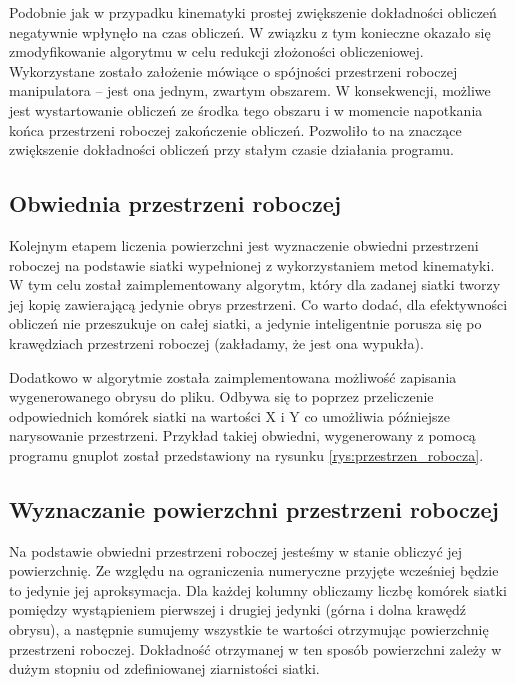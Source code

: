 \documentclass[printmode]{mgr}
\begin{document}
Podobnie jak w przypadku kinematyki prostej zwiększenie dokładności obliczeń negatywnie wpłynęło na czas obliczeń. W związku z tym konieczne okazało się
zmodyfikowanie algorytmu w celu redukcji złożoności obliczeniowej. Wykorzystane zostało założenie mówiące
o spójności przestrzeni roboczej manipulatora -- jest ona jednym, zwartym obszarem. W konsekwencji, możliwe jest
wystartowanie obliczeń ze środka tego obszaru i w momencie napotkania końca przestrzeni roboczej zakończenie obliczeń.
Pozwoliło to na znaczące zwiększenie dokładności obliczeń przy stałym czasie działania programu.

\subsection{Obwiednia przestrzeni roboczej}
Kolejnym etapem liczenia powierzchni jest wyznaczenie obwiedni przestrzeni roboczej na podstawie
siatki wypełnionej z wykorzystaniem metod kinematyki. W tym celu został zaimplementowany algorytm, 
który dla zadanej siatki tworzy jej kopię zawierającą jedynie obrys przestrzeni. Co warto dodać,
dla efektywności obliczeń nie przeszukuje on całej siatki, a jedynie inteligentnie porusza się
po krawędziach przestrzeni roboczej (zakładamy, że jest ona wypukła). 

Dodatkowo w algorytmie została zaimplementowana możliwość zapisania wygenerowanego obrysu do pliku. 
Odbywa się to poprzez przeliczenie odpowiednich komórek siatki na wartości X i Y co umożliwia
późniejsze narysowanie przestrzeni. Przykład takiej obwiedni, wygenerowany z pomocą programu gnuplot
został przedstawiony na rysunku \ref{rys:przestrzen_robocza}. 

\subsection{Wyznaczanie powierzchni przestrzeni roboczej} 
Na podstawie obwiedni przestrzeni roboczej jesteśmy w stanie obliczyć jej powierzchnię. 
Ze względu na ograniczenia numeryczne przyjęte wcześniej będzie to jedynie jej aproksymacja. 
Dla każdej kolumny obliczamy liczbę komórek siatki pomiędzy wystąpieniem pierwszej i drugiej jedynki
(górna i dolna krawędź obrysu), a następnie sumujemy wszystkie te wartości otrzymując powierzchnię przestrzeni
roboczej. Dokładność otrzymanej w ten sposób powierzchni zależy w dużym stopniu od zdefiniowanej
ziarnistości siatki. 
\end{document}
